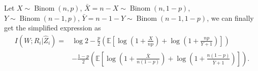 \documentclass[onecolumn,romanappendices,10pt]{IEEEtran}
\newcommand{\EE}{{\mathbb{E}}}
\DeclareMathOperator{\Binomial}{Binom}
\begin{document}
	Let $X \sim \Binomial(n, p)$, $\bar{X} = n - X \sim \Binomial(n, 1 - p)$, $Y \sim \Binomial(n - 1, p)$, $\bar{Y} = n - 1 - Y \sim \Binomial(n - 1, 1 - p)$, we can finally get the simplified expression as
	\begin{equation}
		\begin{aligned}
			I\left( W; R_i | \hat{Z}_{i} \right) =& \log 2 - \frac{p}{2} \left(\EE \left[ \log \left( 1 + \frac{X}{n p} \right) + \log \left( 1 + \frac{n p}{Y + 1} \right) \right] \right) \\
			&- \frac{1 - p}{2} \left( \EE \left[ \log \left( 1 + \frac{\bar{X}}{n (1 - p)} \right) + \log \left( 1 + \frac{n (1 - p)}{\bar{Y} + 1} \right) \right] \right).
		\end{aligned}
		\label{eq:Ber_SICIMI}
	\end{equation}
	
\end{document}
